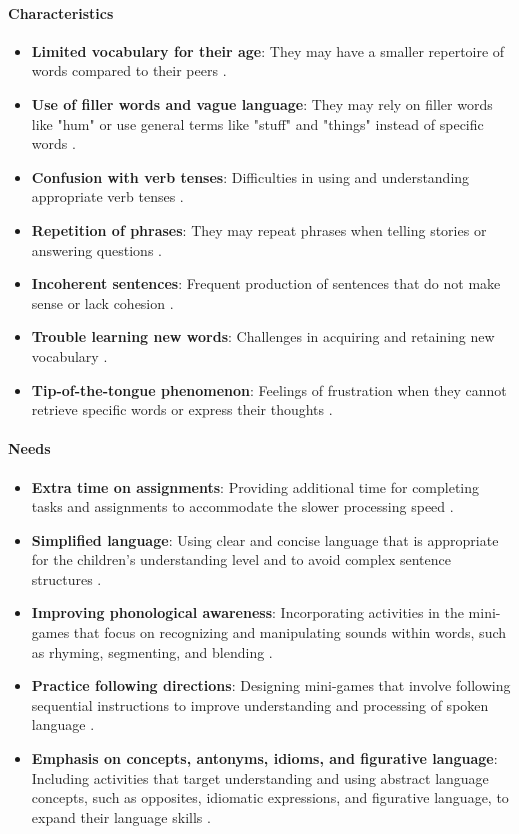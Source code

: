 \paragraph{Characteristics}
\begin{itemize}
    \item \textbf{Limited vocabulary for their age}: They may have a smaller repertoire of words compared to their peers \cite{additude}.
    \item \textbf{Use of filler words and vague language}: They may rely on filler words like "hum" or use general terms like "stuff" and "things" instead of specific words \cite{additude}.
    \item \textbf{Confusion with verb tenses}: Difficulties in using and understanding appropriate verb tenses \cite{greatspeech}.
    \item \textbf{Repetition of phrases}: They may repeat phrases when telling stories or answering questions \cite{additude}.
    \item \textbf{Incoherent sentences}: Frequent production of sentences that do not make sense or lack cohesion \cite{additude}.
    \item \textbf{Trouble learning new words}: Challenges in acquiring and retaining new vocabulary \cite{additude}.
    \item \textbf{Tip-of-the-tongue phenomenon}: Feelings of frustration when they cannot retrieve specific words or express their thoughts \cite{additude}.
\end{itemize}

\paragraph{Needs}
\begin{itemize}
    \item \textbf{Extra time on assignments}: Providing additional time for completing tasks and assignments to accommodate the slower processing speed \cite{vanderbilt}.
    \item \textbf{Simplified language}: Using clear and concise language that is appropriate for the children's understanding level and to avoid complex sentence structures \cite{additude}.
    \item \textbf{Improving phonological awareness}: Incorporating activities in the mini-games that focus on recognizing and manipulating sounds within words, such as rhyming, segmenting, and blending \cite{vanderbilt}.
    \item \textbf{Practice following directions}: Designing mini-games that involve following sequential instructions to improve understanding and processing of spoken language \cite{vanderbilt}.
    \item \textbf{Emphasis on concepts, antonyms, idioms, and figurative language}: Including activities that target understanding and using abstract language concepts, such as opposites, idiomatic expressions, and figurative language, to expand their language skills \cite{vanderbilt}.
\end{itemize}

